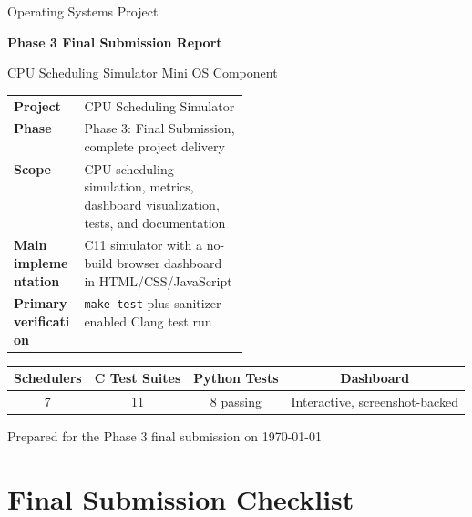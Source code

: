 \documentclass[11pt]{article}
\newcommand{\artifact}[1]{\texttt{#1}}
\begin{document}
\hypersetup{pageanchor=false}

\begin{titlepage}
\centering
\vspace*{0.7cm}
{\Large Operating Systems Project\par}
\vspace{0.35cm}
{\Huge\bfseries Phase 3 Final Submission Report\par}
\vspace{0.35cm}
{\LARGE CPU Scheduling Simulator Mini OS Component\par}
\vspace{0.8cm}

\begin{summarybox}
\begin{tabularx}{0.92\linewidth}{>{\bfseries}p{0.30\linewidth}X}
Project & CPU Scheduling Simulator \\
Phase & Phase 3: Final Submission, complete project delivery \\
Scope & CPU scheduling simulation, metrics, dashboard visualization, tests, and documentation \\
Main implementation & C11 simulator with a no-build browser dashboard in HTML/CSS/JavaScript \\
Primary verification & \artifact{make test} plus sanitizer-enabled Clang test run \\
\end{tabularx}
\end{summarybox}

\vspace{0.8cm}
\begin{tabular}{cccc}
\toprule
\textbf{Schedulers} & \textbf{C Test Suites} & \textbf{Python Tests} & \textbf{Dashboard} \\
\midrule
7 & 11 & 8 passing & Interactive, screenshot-backed \\
\bottomrule
\end{tabular}

\vfill
{\large Prepared for the Phase 3 final submission on \today\par}
\end{titlepage}

\hypersetup{pageanchor=true}
\tableofcontents
\newpage
{}

\section{Final Submission Checklist}
\end{document}
